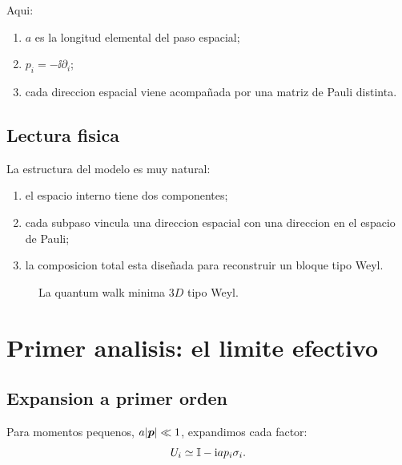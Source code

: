 Aqui:
\begin{enumerate}[label=\arabic*.]
    \item \(a\) es la longitud elemental del paso espacial;
    \item \(p_i=-\ii \partial_i\);
    \item cada direccion espacial viene acompa\~nada por una matriz de Pauli distinta.
\end{enumerate}

\subsection{Lectura fisica}
La estructura del modelo es muy natural:
\begin{enumerate}[label=\arabic*.]
    \item el espacio interno tiene dos componentes;
    \item cada subpaso vincula una direccion espacial con una direccion en el espacio de Pauli;
    \item la composicion total esta dise\~nada para reconstruir un bloque tipo Weyl.
\end{enumerate}

\begin{figure}[h!]
\centering
{}
\caption{La quantum walk minima \(3D\) tipo Weyl.}
\end{figure}

\section{Primer analisis: el limite efectivo}
\subsection{Expansion a primer orden}
Para momentos pequenos, \(a|\bm{p}|\ll 1\), expandimos cada factor:
\begin{equation}
U_i \simeq \mathbb{I} - \mathrm{i} a p_i \sigma_i.
\end{equation}

